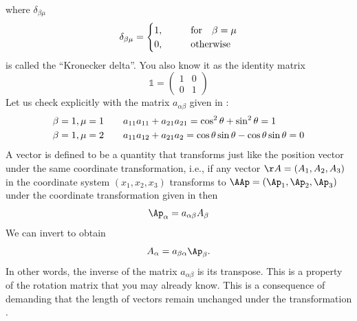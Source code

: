 \begin{subappendices}
where $\delta_{\beta\mu}$
\begin{equation}
\delta_{\beta\mu} =
\begin{cases} 1 \/, & \quad\quad {\rm for}\quad \beta = \mu \\
  0 \/,& \quad\quad {\rm otherwise}
\end{cases}
\end{equation}
is called the ``Kronecker delta''. You also know it as the identity matrix
\begin{equation}
\mathbb{1} = 
\begin{pmatrix}
1 & 0 \\
0 & 1
\end{pmatrix}
\end{equation}
Let us check  explicitly with the matrix $a_{\alpha\beta}$
given in :
\begin{subequations}
\begin{align}
\beta=1\/,\mu=1&\/ \quad\quad a_{11}a_{11} + a_{21}a_{21} =
  \cos^2\theta+\sin^2\theta = 1 \\
\beta=1\/,\mu=2&\/ \quad\quad a_{11}a_{12} + a_{21}a_{2} =
  \cos\theta\sin\theta-\cos\theta\sin\theta = 0 
\end{align}
\end{subequations}
A vector is defined to be a quantity that transforms just like the
position vector under the same coordinate transformation, i.e., if any
vector $\AA= (A_1,A_2,A_3)$ in the coordinate system $(x_1,x_2,x_3)$
transforms to $\AAp = (\Ap_1,\Ap_2,\Ap_3)$ under the coordinate
transformation given in  then 
\begin{equation}
\Ap_{\alpha} = a_{\alpha\beta} A_{\beta}
\label{eq:Ap}
\end{equation}
We can invert  to obtain
\begin{equation} 
 A_{\alpha} = a_{\beta\alpha}\Ap_{\beta} \/.
\label{eq:invert}
\end{equation}
In other words, the inverse of the matrix $a_{\alpha\beta}$ is its
transpose. This is a property of the rotation matrix that you may
already know. This is a consequence of demanding that the length of
vectors remain unchanged under the transformation . 


\end{subappendices}
